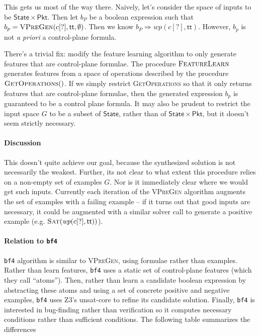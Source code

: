 \documentclass{article}
\newcommand{\TRUE}{\mathsf{tt}}
\newcommand{\Pkt}{\mathsf{Pkt}}
\newcommand{\State}{\mathsf{State}}
\newcommand{\WP}{\textit{wp}}
\newcommand{\instr}{[?]}
\theoremstyle{plain}
\theoremstyle{definition}
\theoremstyle{remark}
\begin{document}
This gets us most of the way there. Naively, let's consider the space of inputs
to be $\State \times \Pkt$. Then let $b_P$ be a boolean expression such that
$b_p = \textsc{VPreGen}(c\instr,\TRUE,\emptyset)$. Then we know $b_P \Rightarrow
\WP(c\instr,\TRUE)$. However, $b_p$ is not \emph{a priori} a control-plane
formula.

There's a trivial fix: modify the feature learning algorithm to only generate
features that are control-plane formulae. The procedure $\textsc{FeatureLearn}$
generates features from a space of operations described by the procedure
$\textsc{GetOperations}()$. If we simply restrict \textsc{GetOperations} so that
it only returns features that are control-plane formulae, then the generated
expression $b_p$ is guaranteed to be a control plane formula. It may also be
prudent to restrict the input space $G$ to be a subset of $\State$, rather than
of $\State \times \Pkt$, but it doesn't seem strictly necessary.


\paragraph{Discussion} This doesn't quite achieve our goal, because the
synthesized solution is not necessarily the weakest. Further, its not clear to
what extent this procedure relies on a non-empty set of examples $G$. Nor is it
immediately clear where we would get such inputs. Currently each iteration of
the \textsc{VPreGen} algorithm augments the set of examples with a failing
example -- if it turns out that good inputs are necessary, it could be augmented
with a similar solver call to generate a positive example (e.g.
$\textsc{Sat}(\WP(c\instr,\TRUE))$).

\paragraph{Relation to \texttt{bf4}}  \texttt{bf4} algorithm is similar to
\textsc{VPreGen}, using formulae rather than examples. Rather than learn features, \texttt{bf4} uses a static set of
control-plane features (which they call ``atoms''). Then, rather than learn a
candidate boolean expression by abstracting these atoms and using a set of
concrete positive and negative examples, \texttt{bf4} uses Z3's unsat-core to
refine its candidate solution. Finally, \texttt{bf4} is interested in
bug-finding rather than verification so it computes necessary conditions rather
than sufficient conditions. The following table summarizes the differences
\end{document}
